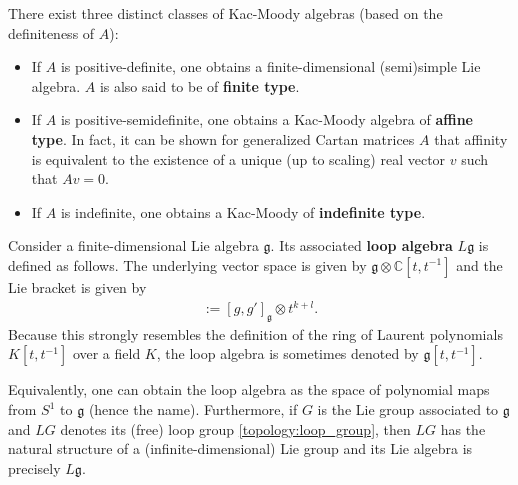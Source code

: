     \begin{remark}[Classification]
        There exist three distinct classes of Kac-Moody algebras (based on the definiteness of $A$):
        \begin{itemize}
            \item If $A$ is positive-definite, one obtains a finite-dimensional (semi)simple Lie algebra. $A$ is also said to be of \textbf{finite type}.
            \item If $A$ is positive-semidefinite, one obtains a Kac-Moody algebra of \textbf{affine type}. In fact, it can be shown for generalized Cartan matrices $A$ that affinity is equivalent to the existence of a unique (up to scaling) real vector $v$ such that $Av=0$.
            \item If $A$ is indefinite, one obtains a Kac-Moody of \textbf{indefinite type}.
        \end{itemize}
    \end{remark}

    \begin{definition}
        Consider a finite-dimensional Lie algebra $\mathfrak{g}$. Its associated \textbf{loop algebra} $L\mathfrak{g}$ is defined as follows. The underlying vector space is given by $\mathfrak{g}\otimes\mathbb{C}[t,t^{-1}]$ and the Lie bracket is given by
        \begin{gather}
            [g\otimes t^k,g'\otimes t^l] := [g,g']_{\mathfrak{g}}\otimes t^{k+l}.
        \end{gather}
        Because this strongly resembles the definition of the ring of Laurent polynomials $K[t,t^{-1}]$ over a field $K$, the loop algebra is sometimes denoted by $\mathfrak{g}[t,t^{-1}]$.

        Equivalently, one can obtain the loop algebra as the space of polynomial maps from $S^1$ to $\mathfrak{g}$ (hence the name). Furthermore, if $G$ is the Lie group associated to $\mathfrak{g}$ and $LG$ denotes its (free) loop group \ref{topology:loop_group}, then $LG$ has the natural structure of a (infinite-dimensional) Lie group and its Lie algebra is precisely $L\mathfrak{g}$.
    \end{definition}

